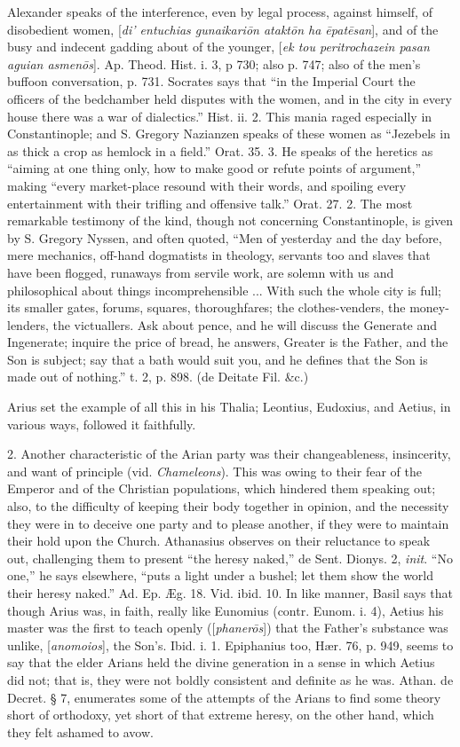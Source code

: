 Alexander speaks of the interference, even by
legal process, against himself, of disobedient women, [\emph{di'
entuchias gunaikari\={o}n atakt\={o}n ha \={e}pat\={e}san}],
and of the busy and indecent gadding about of the younger, [\emph{ek tou
peritrochazein pasan aguian asmen\={o}s}]. Ap. Theod. Hist. i.
3, p 730; also p. 747; also of the men's buffoon conversation, p. 731.
Socrates says that ``in the Imperial Court the officers of the
bedchamber held disputes with the women, and in the city in every
house there was a war of dialectics.'' Hist. ii. 2. This mania raged
especially in Constantinople; and S. Gregory Nazianzen speaks of these
women as ``Jezebels in as thick a crop as hemlock in a field.'' Orat.
35. 3. He speaks of the heretics as ``aiming at one thing only, how to
make good or refute points of argument,'' making ``every market-place
resound with their words, and spoiling every entertainment with their
trifling and offensive talk.'' Orat. 27. 2. The most remarkable
testimony of the kind, though not concerning Constantinople, is given
by S. Gregory Nyssen, and often quoted, ``Men of yesterday and the day
before, mere mechanics, off-hand dogmatists in theology, servants too
and slaves that have been flogged, runaways from servile work, are
solemn with us and philosophical about things incomprehensible ...
With such the whole city is full; its smaller gates, forums, squares,
thoroughfares; the clothes-venders, the money-lenders, the victuallers.
Ask about pence, and he will discuss the Generate and Ingenerate;
inquire the price of bread, he answers, Greater is the Father, and the
Son is subject; say that a bath would suit you, and he defines
that the Son is made out of nothing.'' t. 2, p. 898. (de Deitate Fil.
\&c.)

Arius set the example of all this in his Thalia;
Leontius, Eudoxius, and Aetius, in various ways, followed it
faithfully.

2. Another characteristic of the Arian party was
their changeableness, insincerity, and want of principle (vid. \emph{Chameleons}).
This was owing to their fear of the Emperor and of the Christian
populations, which hindered them speaking out; also, to the difficulty
of keeping their body together in opinion, and the necessity they were
in to deceive one party and to please another, if they were to
maintain their hold upon the Church. Athanasius observes on their
reluctance to speak out, challenging them to present ``the heresy
naked,'' de Sent. Dionys. 2, \emph{init}. ``No one,'' he says elsewhere, ``puts
a light under a bushel; let them show the world their heresy naked.''
Ad. Ep. Æg. 18. Vid. ibid. 10. In like manner, Basil says that though
Arius was, in faith, really like Eunomius (contr. Eunom. i. 4), Aetius
his master was the first to teach openly ([\emph{phaner\={o}s}])
that the Father's substance was unlike, [\emph{anomoios}], the Son's.
Ibid. i. 1. Epiphanius too, Hær. 76, p. 949, seems to say that the
elder Arians held the divine generation in a sense in which Aetius did
not; that is, they were not boldly consistent and definite as he was.
Athan. de Decret. § 7, enumerates some of the attempts of the Arians
to find some theory short of orthodoxy, yet short of that extreme
heresy, on the other hand, which they felt ashamed to avow.

